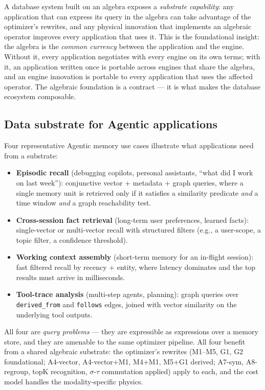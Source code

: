 \documentclass[sigconf,nonacm,review]{acmart}
\theoremstyle{plain}
\theoremstyle{definition}
\theoremstyle{remark}
\begin{document}
A database system built on an algebra exposes a \emph{substrate
capability}: any application that can express its query in the
algebra can take advantage of the optimizer's rewrites, and any
physical innovation that implements an algebraic operator improves
every application that uses it. This is the foundational insight: the
algebra is the \emph{common currency} between the application and
the engine. Without it, every application negotiates with every
engine on its own terms; with it, an application written once is
portable across engines that share the algebra, and an engine
innovation is portable to every application that uses the affected
operator. The algebraic foundation is a contract --- it is what
makes the database ecosystem composable.

\subsection{Data substrate for Agentic applications}\label{sec:intro:substrate}

Four representative Agentic memory use cases illustrate what
applications need from a substrate:

\begin{itemize}[leftmargin=*]
  \item \textbf{Episodic recall} (debugging copilots, personal
    assistants, ``what did I work on last week''): conjunctive vector
    + metadata + graph queries, where a single memory unit is
    retrieved only if it satisfies a similarity predicate \emph{and} a
    time window \emph{and} a graph reachability test.
  \item \textbf{Cross-session fact retrieval} (long-term user
    preferences, learned facts): single-vector or multi-vector recall
    with structured filters (e.g., a user-scope, a topic filter, a
    confidence threshold).
  \item \textbf{Working context assembly} (short-term memory for an
    in-flight session): fast filtered recall by recency + entity,
    where latency dominates and the top results must arrive in
    milliseconds.
  \item \textbf{Tool-trace analysis} (multi-step agents, planning):
    graph queries over \texttt{derived\_from} and \texttt{follows}
    edges, joined with vector similarity on the underlying tool
    outputs.
\end{itemize}

All four are \emph{query problems} --- they are expressible as
expressions over a memory store, and they are amenable to the same
optimizer pipeline. All four benefit from a shared algebraic
substrate: the optimizer's rewrites (M1--M5, G1, G2 foundational;
A4-vector, A4-vector+M1, M4+M1, M5+G1 derived; A7-sym,
A8-regroup, topK recognition, $\sigma$-$\tau$ commutation applied)
apply to each, and the cost model handles the modality-specific
physics.
\end{document}
